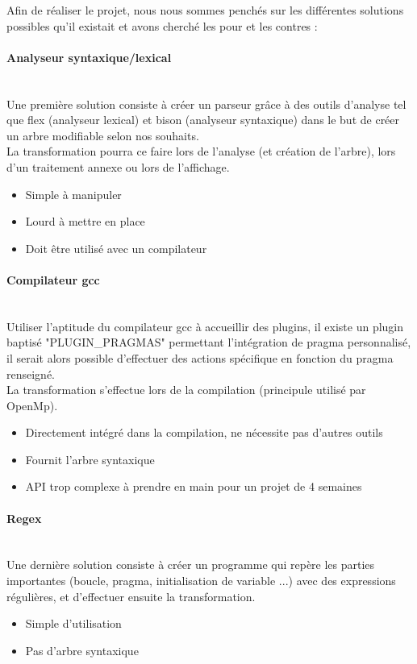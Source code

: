\documentclass{article}
\begin{document}
	Afin de réaliser le projet, nous nous sommes penchés sur les différentes solutions possibles qu'il existait et avons cherché les pour et les contres :
	
	\paragraph{Analyseur syntaxique/lexical}
	~~\\
	\indent
	Une première solution consiste à créer un parseur grâce à des outils d'analyse tel que flex (analyseur lexical) et bison (analyseur syntaxique) dans le but de créer un arbre modifiable selon nos souhaits.\\
	La transformation pourra ce faire lors de l'analyse (et création de l'arbre), lors d'un traitement annexe ou lors de l'affichage.\\
	\begin{itemize}
		\item Simple à manipuler
		\item Lourd à mettre en place
		\item Doit être utilisé avec un compilateur
	\end{itemize}
	
	\paragraph{Compilateur gcc}
		~~\\
	\indent
	Utiliser l'aptitude du compilateur gcc à accueillir des plugins, il existe un plugin baptisé "PLUGIN\_PRAGMAS" permettant l'intégration de pragma personnalisé, il serait alors possible d'effectuer des actions spécifique en fonction du pragma renseigné.\\ La transformation s'effectue lors de la compilation (principule utilisé par OpenMp). \\
	\begin{itemize}
		\item Directement intégré dans la compilation, ne nécessite pas d'autres outils
		\item Fournit l'arbre syntaxique
		\item API trop complexe à prendre en main pour un projet de 4 semaines
	\end{itemize}
	
	
	\paragraph{Regex}
	~~\\
	\indent
	Une dernière solution consiste à créer un programme qui repère les parties importantes (boucle, pragma, initialisation de variable ...) avec des expressions régulières, et d'effectuer ensuite la transformation.
	\begin{itemize}
		\item Simple d'utilisation
		\item Pas d'arbre syntaxique
	\end{itemize}
		
\end{document}
